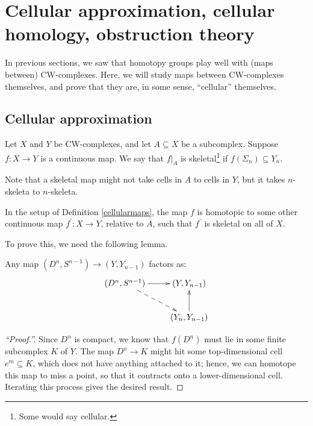 \section{Cellular approximation, cellular homology, obstruction theory}
In previous sections, we saw that homotopy groups play well with (maps between) CW-complexes.
Here, we will study maps between CW-complexes themselves, and prove that they are, in some sense, ``cellular'' themselves.
\subsection{Cellular approximation}
\begin{definition}\label{cellularmaps}
    Let $X$ and $Y$ be CW-complexes, and let $A\subseteq X$ be a subcomplex.
    Suppose $f:X\to Y$ is a continuous map.
    We say that $f|_{A}$ is skeletal\footnote{Some would say cellular.} if $f(\Sigma_n)\subseteq Y_n$. 
\end{definition}
Note that a skeletal map might not take cells in $A$ to cells in $Y$, but it takes $n$-skeleta to $n$-skeleta.
\begin{theorem}\label{cellularapprox}
    In the setup of Definition \ref{cellularmaps}, the map $f$ is homotopic to some other
    continuous map $f^\prime:X\to Y$, relative to $A$, such that $f^\prime$ is skeletal on all of $X$.
\end{theorem}
To prove this, we need the following lemma.
\begin{lemma}
    Any map $(D^n,S^{n-1})\to (Y,Y_{n-1})$ factors as:
    \begin{equation*}
	\xymatrix{
	(D^n,S^{n-1})\ar[r]\ar@{-->}[dr] & (Y,Y_{n-1})\\
	& (Y_n,Y_{n-1})\ar[u]
	}
    \end{equation*}
\end{lemma}
\begin{proof}[``Proof.'']
    Since $D^n$ is compact, we know that $f(D^n)$ must lie in some finite subcomplex $K$ of $Y$.
    The map $D^n\to K$ might hit some top-dimensional cell $e^m\subseteq K$, which does not have anything attached to it;
    hence, we can homotope this map to miss a point, so that it contracts onto a lower-dimensional cell.
    Iterating this process gives the desired result.
\end{proof}
